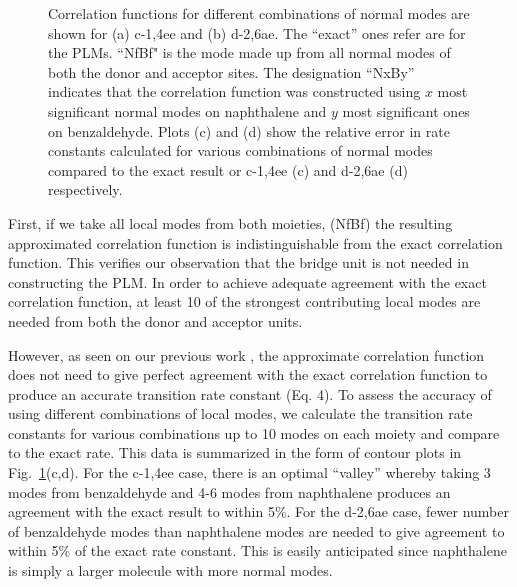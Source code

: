 \begin{figure}[!h]
\caption{Correlation functions for different combinations of normal modes are shown for (a) c-1,4ee and (b) d-2,6ae.  The ``exact'' ones refer are for the PLMs.  ``NfBf"
is the mode made up from all normal modes of both the donor and acceptor sites.
The designation ``NxBy'' indicates that the correlation function was constructed using  $x$ most significant normal modes
on naphthalene and $y$ most significant ones on benzaldehyde.   Plots (c) and (d) show the
 relative error in rate constants calculated for various combinations of normal modes compared to the exact result
 or c-1,4ee (c) and d-2,6ae (d) respectively. \label{backCorr}}
\end{figure}


 First, if we take all local modes from both moieties, (NfBf)
 the resulting approximated correlation function is indistinguishable from the exact correlation function.
This verifies our observation that the bridge unit is not needed in constructing the
PLM.
In order to achieve adequate agreement with the exact correlation function,
at least 10 of the strongest contributing local modes are needed from both the donor and acceptor units.

However, as seen on our previous work \cite{yang2014intramolecular},
the approximate correlation function does not need to give perfect agreement
with the exact correlation function to produce an accurate transition rate constant (Eq. 4).
To assess the accuracy of using different combinations of local modes,
we calculate the transition rate constants for various combinations up to 10 modes on
each moiety and compare to the exact rate.
This data is summarized in the form of contour plots in  Fig.~\ref{backCorr}(c,d).
For the c-1,4ee case, there is an optimal ``valley'' whereby taking 3 modes from benzaldehyde and 4-6 modes from
naphthalene produces an agreement with the exact result to within 5\%.
For the d-2,6ae case,  fewer number of benzaldehyde modes than naphthalene modes are needed to
give agreement to within 5\% of the exact rate constant.   This is easily anticipated since
naphthalene is simply a larger molecule with more normal modes.


